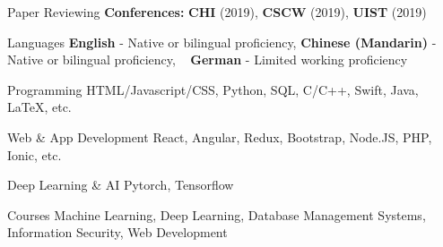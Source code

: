 
\begin{cvskills}
  \cvskill
    {Paper Reviewing} %
    {
      \textbf{Conferences:} \textbf{CHI} (2019), \textbf{CSCW} (2019), \textbf{UIST} (2019)
    } 


  
\end{cvskills}








\begin{cvskills}
  \cvskill
    {Languages} %
    {\textbf{English} - Native or bilingual proficiency, \textbf{Chinese (Mandarin)} - Native or bilingual proficiency, } 
  \cvskill
    {~} %
    {\textbf{German} - Limited working proficiency} 
  
  \cvskill
    {Programming} %
    {HTML/Javascript/CSS, Python, SQL, C/C++, Swift, Java, LaTeX, etc. } 

  \cvskill
    {Web \& App Development} %
    {React, Angular, Redux, Bootstrap, Node.JS, PHP, Ionic, etc.} 

  \cvskill
    {Deep Learning \& AI}
    {Pytorch, Tensorflow} 

  \cvskill
    {Courses} %
    {Machine Learning, Deep Learning, Database Management Systems, Information Security, Web Development} 
\end{cvskills}
